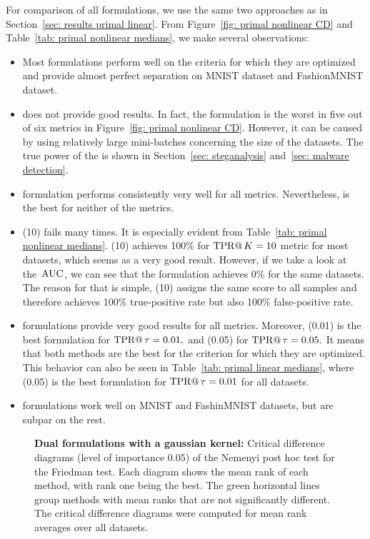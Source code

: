 For comparison of all formulations, we use the same two approaches as in Section~\ref{sec: results primal linear}. From Figure~\ref{fig: primal nonlinear CD} and Table~\ref{tab: primal nonlinear medians}, we make several observations:
\begin{itemize}
  \item Most formulations perform well on the criteria for which they are optimized and provide almost perfect separation on MNIST dataset and FashionMNIST dataset.
  \item \DeepTopPush does not provide good results. In fact, the formulation is the worst in five out of six metrics in Figure~\ref{fig: primal nonlinear CD}. However, it can be caused by using relatively large mini-batches concerning the size of the datasets. The true power of the \DeepTopPush is shown in Section~\ref{sec: steganalysis} and~\ref{sec: malware detection}.
  \item \BaseLine formulation performs consistently very well for all metrics. Nevertheless, \BaseLine is the best for neither of the metrics.
  \item \TopPushK(10) fails many times. It is especially evident from Table~\ref{tab: primal nonlinear medians}. \TopPushK(10) achieves 100\% for $\operatorname{TPR@}K = 10$ metric for most datasets, which seems as a very good result. However, if we take a look at the~$\operatorname{AUC}$, we can see that the formulation achieves 0\% for the same datasets. The reason for that is simple, \TopPushK(10) assigns the same score to all samples and therefore achieves 100\% true-positive rate but also 100\% false-positive rate.
  \item \PatMatNP formulations provide very good results for all metrics. Moreover, \PatMatNP(0.01) is the best formulation for $\operatorname{TPR@}\tau = 0.01,$ and \PatMatNP(0.05) for $\operatorname{TPR@}\tau = 0.05.$ It means that both methods are the best for the criterion for which they are optimized. This behavior can also be seen in Table~\ref{tab: primal linear medians}, where \PatMatNP(0.05) is the best formulation for $\operatorname{TPR@}\tau = 0.01$ for all datasets.
  \item \tauFPL formulations work well on MNIST and FashinMNIST datasets, but are subpar on the rest.
\end{itemize}

\begin{figure}[!p]
  \centering
  
  \caption{\textbf{Dual formulations with a gaussian kernel:} Critical difference diagrams (level of importance 0.05) of the Nemenyi post hoc test for the Friedman test. Each diagram shows the mean rank of each method, with rank one being the best. The green horizontal lines group methods with mean ranks that are not significantly different. The critical difference diagrams were computed for mean rank averages over all datasets.}
  \label{fig: dual gauss CD}
\end{figure}

